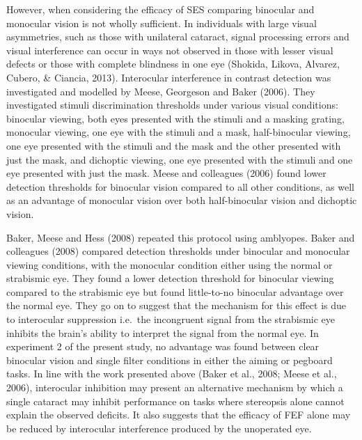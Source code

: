 \documentclass[
  english,
  man,floatsintext]{apa6}
\begin{document}
However, when considering the efficacy of SES comparing binocular and monocular vision is not wholly sufficient.
In individuals with large visual asymmetries, such as those with unilateral cataract, signal processing errors and visual interference can occur in ways not observed in those with lesser visual defects or those with complete blindness in one eye (Shokida, Likova, Alvarez, Cubero, \& Ciancia, 2013).
Interocular interference in contrast detection was investigated and modelled by Meese, Georgeson and Baker (2006).
They investigated stimuli discrimination thresholds under various visual conditions: binocular viewing, both eyes presented with the stimuli and a masking grating, monocular viewing, one eye with the stimuli and a mask, half-binocular viewing, one eye presented with the stimuli and the mask and the other presented with just the mask, and dichoptic viewing, one eye presented with the stimuli and one eye presented with just the mask.
Meese and colleagues (2006) found lower detection thresholds for binocular vision compared to all other conditions, as well as an advantage of monocular vision over both half-binocular vision and dichoptic vision.

Baker, Meese and Hess (2008) repeated this protocol using amblyopes.
Baker and colleagues (2008) compared detection thresholds under binocular and monocular viewing conditions, with the monocular condition either using the normal or strabismic eye.
They found a lower detection threshold for binocular viewing compared to the strabismic eye but found little-to-no binocular advantage over the normal eye.
They go on to suggest that the mechanism for this effect is due to interocular suppression i.e.~the incongruent signal from the strabismic eye inhibits the brain's ability to interpret the signal from the normal eye.
In experiment 2 of the present study, no advantage was found between clear binocular vision and single filter conditions in either the aiming or pegboard tasks.
In line with the work presented above (Baker et al., 2008; Meese et al., 2006), interocular inhibition may present an alternative mechanism by which a single cataract may inhibit performance on tasks where stereopsis alone cannot explain the observed deficits.
It also suggests that the efficacy of FEF alone may be reduced by interocular interference produced by the unoperated eye.
\end{document}
